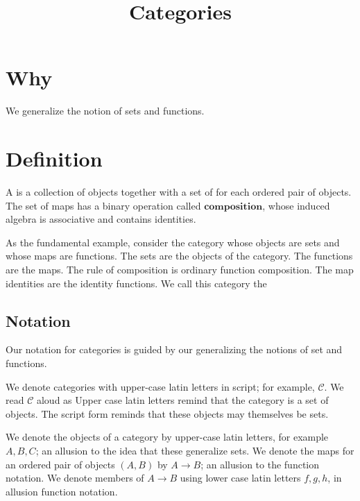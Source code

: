 





\title{Categories}

\section{Why}

We generalize the notion of sets and functions.

\section{Definition}

A  is a collection of objects together with a set of  for each ordered pair of objects.
The set of maps has a binary operation called $\textbf{composition}$, whose induced algebra is associative and contains identities.

As the fundamental example, consider the category whose objects are sets and whose maps are functions.
The sets are the objects of the category.
The functions are the maps.
The rule of composition is ordinary function composition.
The map identities are the identity functions.
We call this category the 

\subsection{Notation}

Our notation for categories is guided by our generalizing the notions of set and functions.

We denote categories with upper-case latin letters in script; for example, $\mathcal{C}$.
We read $\mathcal{C}$ aloud as 
Upper case latin letters remind that the category is a set of objects.
The script form reminds that these objects may themselves be sets.

We denote the objects of a category by upper-case latin letters, for example $A, B, C$; an allusion to the idea that these generalize sets.
We denote the maps for an ordered pair of objects $(A, B)$ by $A \to B$; an allusion to the function notation.
We denote members of $A \to B$  using lower case latin letters $f, g, h$, in allusion function notation.


